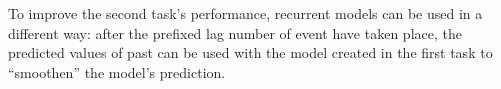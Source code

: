 To improve the second task's performance, recurrent models can be used in a different way: after the prefixed lag number of event have taken place, the predicted values of past can be used with the model created in the first task to ``smoothen'' the model's prediction.








